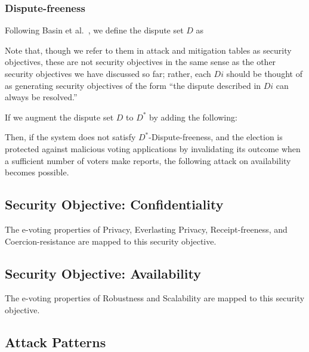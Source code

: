\documentclass[10pt,letterpaper]{article}
\begin{document}
\subsubsection{Dispute-freeness}

Following Basin et al.~\cite{BasinEtAlDisputeResolution2020}, we define the dispute set $D$ as
%


Note that, though we refer to them in attack and mitigation tables as security objectives, these are not security objectives in the same sense as the other security objectives we have discussed so far; rather, each $Di$ should be thought of as generating security objectives of the form ``the dispute described in $Di$ can always be resolved.''



If we augment the dispute set $D$ to $D^*$ by adding the following:
%


Then, if the system does not satisfy $D^*$-Dispute-freeness, and the election is protected against malicious voting applications by invalidating its outcome when a sufficient number of voters make reports, the following attack on availability becomes possible.



\subsection{Security Objective: Confidentiality}

The e-voting properties of Privacy, Everlasting Privacy, Receipt-freeness, and Coercion-resistance are mapped to this security objective.





\subsection{Security Objective: Availability}

The e-voting properties of Robustness and Scalability are mapped to this security objective.





\subsection{Attack Patterns}
\label{sec:attack-patterns}
\end{document}
